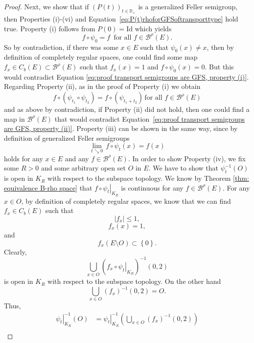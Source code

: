 \documentclass[a4paper,12pt]{article}
\theoremstyle{definition}
\theoremstyle{remark}
\numberwithin{equation}{section}
\numberwithin{theorem}{section}
\begin{document}
\begin{proof}
Next, we show that if $\left(P(t)\right)_{t\in\mathbb{R}_{+}}$ is
a generalized Feller semigroup, then Properties (i)-(vi) and Equation~\eqref{eq:P(t)rhoforGFSoftransporttype} hold true.
Property (i) follows from $P(0)=\text{Id}$ which yields
\begin{equation}
f\circ\psi_{0}=f\,\text{ for all }f\in\mathcal{\mathscr{B}}^{\rho}(E).\label{eq:proof transport semigroups are GFS, property (i)}
\end{equation}
So by contradiction, if there was some $x\in E$ such that $\psi_{0}(x)\neq x$,
then by definition of completely regular spaces, one could find some
map $f_{x}\in C_{b}(E)\subset\mathcal{\mathscr{B}}^{\rho}(E)$ such
that $f_{x}(x)=1$ and $f\circ\psi_{0}(x)=0$. But this would contradict
Equation \ref{eq:proof transport semigroups are GFS, property (i)}. 
Regarding Property (ii), as in the proof of Property (i) we obtain
\begin{equation}
f\circ\left(\psi_{t_{1}}\circ\psi_{t_{2}}\right)=f\circ\left(\psi_{t_{1}+t_{2}}\right)\,\text{for all }f\in\mathcal{\mathscr{B}}^{\rho}(E)\label{eq:proof transport semigroups are GFS, property (ii)}
\end{equation}
and as above by contradiction, if Property (ii) did not hold, then
one could find a map in $\mathcal{\mathscr{B}}^{\rho}(E)$ that would
contradict Equation~\eqref{eq:proof transport semigroups are GFS, property (ii)}. 
Property (iii) can be shown in the same way, since by definition of
generalized Feller semigroups 
\[
\underset{t\searrow0}{\lim}\,f\circ\psi_{t}(x)=f(x)
\]
holds for any $x\in E$ and any $f\in\mathcal{\mathscr{B}}^{\rho}(E)$. 
In order to show Property (iv), we fix some $R>0$ and some arbitrary
open set $O$ in $E$. We have to show that $\psi_{t}^{-1}(O)$ is
open in $K_{R}$ with respect to the subspace topology. We know by
Theorem \ref{thm: equivalence B-rho space} that $\left.f\circ\psi_{t}\right|_{K_{R}}$
is continuous for any $f\in\mathcal{\mathscr{B}}^{\rho}(E)$. For
any $x\in O$, by definition of completely regular spaces, we know
that we can find $f_{x}\in C_{b}\left(E\right)$ such that
\[
\left|f_{x}\right|\leq1,
\]
\[
f_{x}(x)=1,
\]
 and
\[
f_{x}(E\setminus O)\subset\left\{ 0\right\} .
\]
Clearly, 
\[
\underset{x\in O}{\bigcup}\left(\left.f_{x}\circ\psi_{t}\right|_{K_{R}}\right)^{-1}\left(0,2\right)
\]
is open in $K_{R}$ with respect to the subspace topology. On the
other hand 
\[
\underset{x\in O}{\bigcup}\left(f_{x}\right)^{-1}\left(0,2\right)=O.
\]
Thus, 
\begin{align*}
\left.\psi_{t}\right|_{K_{R}}^{-1}(O) & =\left.\psi_{t}\right|_{K_{R}}^{-1}\left(\underset{x\in O}{\bigcup}\left(f_{x}\right)^{-1}\left(0,2\right)\right)\\

\end{align*}
\end{proof}
\end{document}
